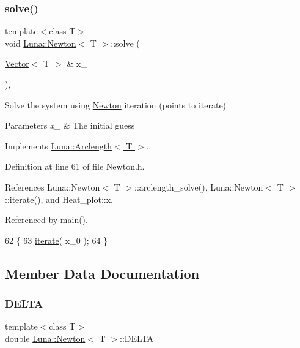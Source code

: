 \subsubsection{\texorpdfstring{solve()}{solve()}}
{\footnotesize\ttfamily template$<$class T$>$ \\
void \hyperlink{classLuna_1_1Newton}{Luna\+::\+Newton}$<$ T $>$\+::solve (\begin{DoxyParamCaption}\item[{\hyperlink{classLuna_1_1Vector}{Vector}$<$ T $>$ \&}]{x\+\_ }\end{DoxyParamCaption})\hspace{0.3cm}{\ttfamily [inline]}, {\ttfamily [virtual]}}



Solve the system using \hyperlink{classLuna_1_1Newton}{Newton} iteration (points to iterate) 


\begin{DoxyParams}{Parameters}
{\em x\+\_} & The initial guess \\
\hline
\end{DoxyParams}


Implements \hyperlink{classLuna_1_1Arclength_a0829d51bb49011f5ed56c25b7554d115}{Luna\+::\+Arclength$<$ T $>$}.



Definition at line 61 of file Newton.\+h.



References Luna\+::\+Newton$<$ T $>$\+::arclength\+\_\+solve(), Luna\+::\+Newton$<$ T $>$\+::iterate(), and Heat\+\_\+plot\+::x.



Referenced by main().


\begin{DoxyCode}
62       \{
63         \hyperlink{classLuna_1_1Newton_a3de816dba7a950702b6f93fc710d4f03}{iterate}( x\_0 );
64       \}
\end{DoxyCode}


\subsection{Member Data Documentation}
\mbox{\label{classLuna_1_1Newton_ad4862420392d9eb80d135b9c28dd47cb}} 
\subsubsection{\texorpdfstring{D\+E\+L\+TA}{DELTA}}
{\footnotesize\ttfamily template$<$class T$>$ \\
double \hyperlink{classLuna_1_1Newton}{Luna\+::\+Newton}$<$ T $>$\+::D\+E\+L\+TA\hspace{0.3cm}{\ttfamily [protected]}}



